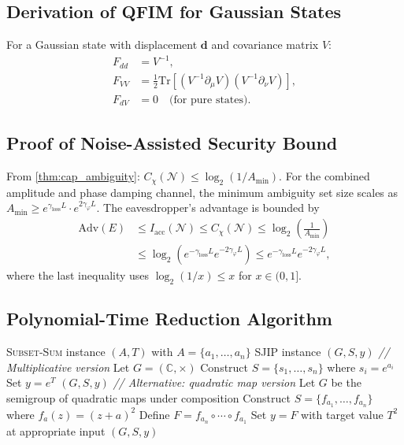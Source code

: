 \documentclass[journal,twocolumn]{IEEEtran}
\theoremstyle{definition}
\theoremstyle{plain}
\newcommand{\Tr}{\mathrm{Tr}}
\begin{document}
\subsection{Derivation of QFIM for Gaussian States}

For a Gaussian state with displacement $\mathbf{d}$ and covariance
matrix $V$:
\begin{align}
  F_{dd} &= V^{-1}, \\
  F_{VV} &= \frac{1}{2}\Tr\!\left[(V^{-1}\partial_\mu V)
    (V^{-1}\partial_\nu V)\right], \\
  F_{dV} &= 0\quad\text{(for pure states)}.
\end{align}

\subsection{Proof of Noise-Assisted Security Bound}

From \cref{thm:cap_ambiguity}: $C_\chi(\mathcal{N})\le\log_2(1/A_{\min})$.
For the combined amplitude and phase damping channel, the minimum
ambiguity set size scales as
$A_{\min}\ge e^{\gamma_{\mathrm{loss}}L}\cdot e^{2\gamma_\varphi L}$.
The eavesdropper's advantage is bounded by
\begin{align}
  \mathrm{Adv}(E) &\le I_{\mathrm{acc}}(\mathcal{N})\le C_\chi(\mathcal{N})
  \le\log_2\!\left(\frac{1}{A_{\min}}\right)\nonumber\\
  &\le\log_2\!\left(e^{-\gamma_{\mathrm{loss}}L}e^{-2\gamma_\varphi L}\right)
  \le e^{-\gamma_{\mathrm{loss}}L}e^{-2\gamma_\varphi L},
\end{align}
where the last inequality uses $\log_2(1/x)\le x$ for $x\in(0,1]$.

\subsection{Polynomial-Time Reduction Algorithm}

\begin{algorithm}[H]
\caption{Polynomial-Time Reduction: \textsc{Subset-Sum} to SJIP}
\begin{algorithmic}[1]
\Require \textsc{Subset-Sum} instance $(A,T)$ with
  $A=\{a_1,\dots,a_n\}$
\Ensure SJIP instance $(G,S,y)$
\State \textit{// Multiplicative version}
\State Let $G=(\mathbb{C},\times)$
\State Construct $S=\{s_1,\dots,s_n\}$ where $s_i=e^{a_i}$
\State Set $y=e^T$
\Return $(G,S,y)$
\State \textit{// Alternative: quadratic map version}
\State Let $G$ be the semigroup of quadratic maps under composition
\State Construct $S=\{f_{a_1},\dots,f_{a_n}\}$ where
  $f_a(z)=(z+a)^2$
\State Define $F=f_{a_n}\circ\cdots\circ f_{a_1}$
\State Set $y=F$ with target value $T^2$ at appropriate input
\Return $(G,S,y)$
\end{algorithmic}
\end{algorithm}
\end{document}
